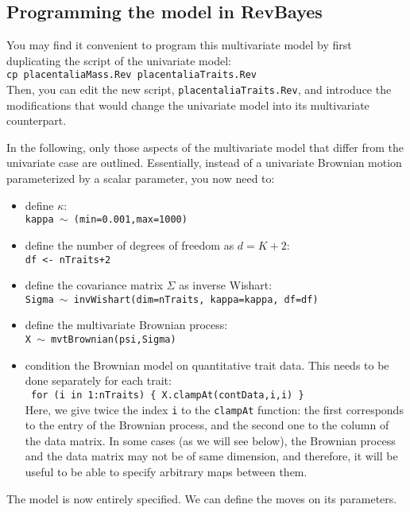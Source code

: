 \documentclass[usletter]{article}
\newcommand{\cmd}[1]{\texttt{#1}}
\begin{document}
\subsection*{Programming the model in RevBayes}

You may find it convenient to program this multivariate model by first duplicating the script of the univariate model:
\\
\cmd{cp placentaliaMass.Rev placentaliaTraits.Rev}
\\
Then, you can edit the new script, \cmd{placentaliaTraits.Rev}, and introduce the modifications that would change the univariate model
into its multivariate counterpart.

In the following, only those aspects of the multivariate model that differ from the univariate case are outlined.
Essentially, instead of a univariate Brownian motion parameterized by a scalar parameter, you now need to:
\begin{itemize}
\item
define $\kappa$:
\\
\cmd{kappa $\sim$ (min=0.001,max=1000)}
\item
define the number of degrees of freedom as $d = K+2$:
\\
\cmd{df <- nTraits+2}
\item
define the covariance matrix $\Sigma$ as inverse Wishart:
\\
\cmd{Sigma $\sim$ invWishart(dim=nTraits, kappa=kappa, df=df)}
\item
define the multivariate Brownian process:
\\
\cmd{X $\sim$ mvtBrownian(psi,Sigma)}
\item
condition the Brownian model on quantitative trait data.
This needs to be done separately for each trait:
\\
\cmd{
for (i in 1:nTraits)    \{
        X.clampAt(contData,i,i)
\}
}
\\
Here, we give twice the index \cmd{i} to the \cmd{clampAt} function: the first corresponds to the entry of the Brownian process, and the second one to the column of the data matrix. In some cases (as we will see below), the Brownian process and the data matrix may not be of same dimension, and therefore, it will be useful to be able to specify arbitrary maps between them.
\end{itemize}
The model is now entirely specified. We can define the moves on its parameters.
\end{document}
